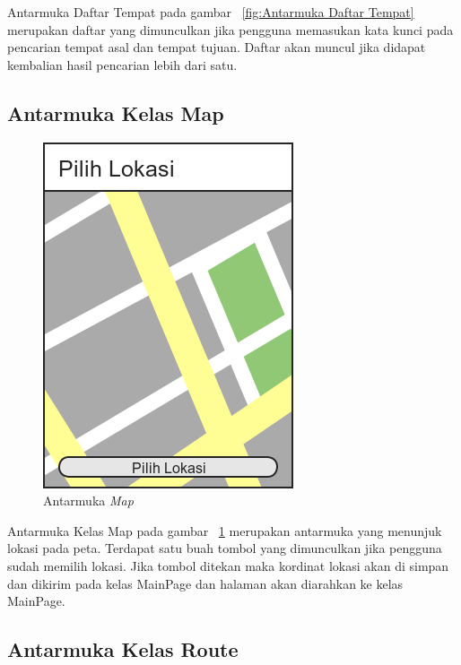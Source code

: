 \hspace{0.5cm} Antarmuka Daftar Tempat pada gambar ~\ref{fig:Antarmuka Daftar Tempat} merupakan daftar yang dimunculkan jika pengguna memasukan kata kunci pada pencarian tempat asal dan tempat tujuan. Daftar akan muncul jika didapat kembalian hasil pencarian lebih dari satu.

\subsection{Antarmuka Kelas Map}
\label{lab:Antarmuka Kelas Map}

\begin{figure}[h]
	\centering
		\includegraphics[scale=0.6]{Gambar/perancangan_antarmuka/Map}
	\caption{Antarmuka \textit{Map}}
	\label{fig:Antarmuka Map}
\end{figure}

\hspace{0.5cm} Antarmuka Kelas Map pada gambar ~\ref{fig:Antarmuka Map} merupakan antarmuka yang menunjuk lokasi pada peta. Terdapat satu buah tombol yang dimunculkan jika pengguna sudah memilih lokasi. Jika tombol ditekan maka kordinat lokasi akan di simpan dan dikirim pada kelas MainPage dan halaman akan diarahkan ke kelas MainPage.

\subsection{Antarmuka Kelas Route}
\label{lab:Antarmuka Kelas Route}

